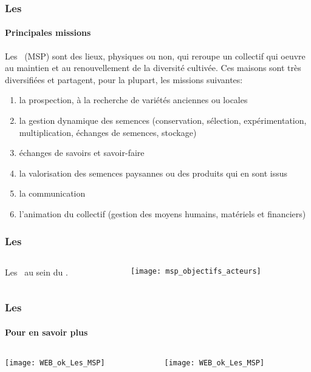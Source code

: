 \begin{frame}
\frametitle{Les \MSPs}
\framesubtitle{Principales missions}

Les \MSPs~(MSP) sont des lieux, physiques ou non, qui reroupe un collectif qui oeuvre au maintien et au renouvellement de la diversité cultivée.
Ces maisons sont très diversifiées et partagent, pour la plupart, les missions suivantes:

\begin{enumerate}[<+->]
\item la prospection, à la recherche de variétés anciennes ou locales
\item la  gestion dynamique des semences (conservation, sélection, expérimentation, multiplication, échanges de semences, stockage)
\item échanges de savoirs et savoir-faire
\item la valorisation des semences paysannes ou des produits qui en sont issus
\item la communication
\item l'animation du collectif (gestion des moyens humains, matériels et financiers)
\end{enumerate}

\end{frame}



\begin{frame}
\frametitle{Les \MSPs}

\begin{columns}

\begin{column}{.5\textwidth}
Les \MSPs~au sein du \RSP.

\end{column}

\begin{column}{.5\textwidth}
\texttt{[image: msp\_objectifs\_acteurs]} \tiny \cite{msp_objectifs_acteurs}
\end{column}

\end{columns}

\end{frame}


\begin{frame}
\frametitle{Les \MSPs}
\framesubtitle{Pour en savoir plus}

\begin{columns}

\begin{column}{.5\textwidth}
\texttt{[image: WEB\_ok\_Les\_MSP]} \tiny \cite{WEB_ok_Les_MSP}
\end{column}

\begin{column}{.5\textwidth}
\texttt{[image: WEB\_ok\_Les\_MSP]} \tiny \cite{WEB_ok_Les_MSP}
\end{column}

\end{columns}

\end{frame}


